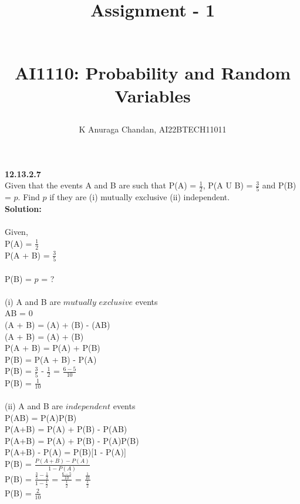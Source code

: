 \documentclass[10pt]{article}
\begin{document}
\title{\begin{huge}Assignment - 1\end{huge} \\AI1110: Probability and Random Variables}
\author{K Anuraga Chandan, AI22BTECH11011}
\maketitle



\textbf{12.13.2.7} 
\\Given that the events A and B are such that P(A) = $\frac{1}{2}$, P(A U B) = $\frac{3}{5}$ and P(B) = $p$. Find $p$ if they are (i) mutually exclusive (ii) independent.\\

\textbf{Solution:}\\\\Given,
\\ P(A) = $\frac{1}{2}$ 
\\ P(A + B) = $\frac{3}{5}$
\\\\ P(B) = $p$ = ?\\
\\(i) A and B are $mutually$ $exclusive$ events
\\ AB = 0
\\ (A + B) = (A) + (B) - (AB)
\\ (A + B) = (A) + (B)
\\ P(A + B) = P(A) + P(B)
\\ P(B) = P(A + B) - P(A)
\\ P(B) = $\frac{3}{5}$ - $\frac{1}{2}$ = $\frac{6 - 5}{10}$
\\ P(B) = $\frac{1}{10}$\\
\\(ii) A and B are $independent$ events 
\\P(AB) = P(A)P(B)
\\P(A+B) = P(A) + P(B) - P(AB)
\\P(A+B) = P(A) + P(B) - P(A)P(B)
\\P(A+B) - P(A) = P(B)[1 - P(A)]
\\P(B) = $\frac{P(A+B) - P(A)}{1 - P(A)}$
\\P(B) = $\frac{\frac{3}{5} - \frac{1}{2}}{1 - \frac{1}{2}}$ = $\frac{\frac{6 - 5}{10}}{\frac{1}{2}}$ = $\frac{\frac{1}{10}}{\frac{1}{2}}$
\\P(B) = $\frac{2}{10}$
\end{document}
